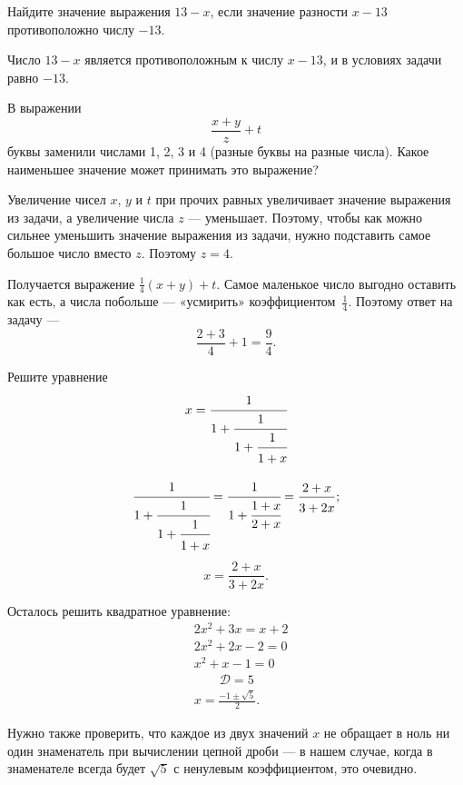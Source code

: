﻿


\begin{itemize}

	\itA Найдите значение выражения $13-x$, если значение разности $x-13$ противоположно числу $-13$.
	
	\itr Число $13-x$ является противоположным к числу $x-13$, и в условиях задачи равно $-13$.
	
	\itB В выражении
	$$\frac{x+y}{z} + t$$
	буквы заменили числами 1, 2, 3 и 4 (разные буквы на разные числа). Какое наименьшее значение может принимать это выражение?
	
	\itr Увеличение чисел $x$, $y$ и $t$ при прочих равных увеличивает значение выражения из задачи, а увеличение числа $z$ — уменьшает. Поэтому, чтобы как можно сильнее уменьшить значение выражения из задачи, нужно подставить самое большое число вместо $z$. Поэтому $z=4$.
	
	Получается выражение $\tfrac{1}{4} (x+y) + t$. Самое маленькое число выгодно оставить как есть, а числа побольше — «усмирить» коэффициентом~$\tfrac{1}{4}$. Поэтому ответ на задачу —
	$$\frac{2+3}{4} + 1 = \frac{9}{4}.$$
	
	\itC Решите уравнение
	$$x = \cfrac{1}{
		1 + \cfrac{1}{
			1 + \cfrac{1}{
				1+x \vphantom{\int^0}}}}$$
	
	\itr
	$$\cfrac{1}{
		1 + \cfrac{1}{
			1 + \cfrac{1}{
				1+x \vphantom{\int^0}}}}
	= \cfrac{1}{1+\cfrac{1+x}{2+x}}
	= \frac{2+x}{3+2x \vphantom{\int^0}};$$
	$$x = \frac{2+x}{3+2x}.$$
	
	Осталось решить квадратное уравнение:
	\begin{align*}
		& 2x^2 + 3x = x+2 \\
		& 2x^2 + 2x - 2 = 0 \\
		& x^2 + x - 1 = 0 \\
		& \qquad \mathcal D = 5 \\
		& x = \frac{-1 \pm \sqrt{5}}{2}.
	\end{align*}
	
	Нужно также проверить, что каждое из двух значений $x$ не обращает в ноль ни один знаменатель при вычислении цепной дроби — в нашем случае, когда в знаменателе всегда будет $\sqrt 5$ с ненулевым коэффициентом, это очевидно.

\end{itemize}


